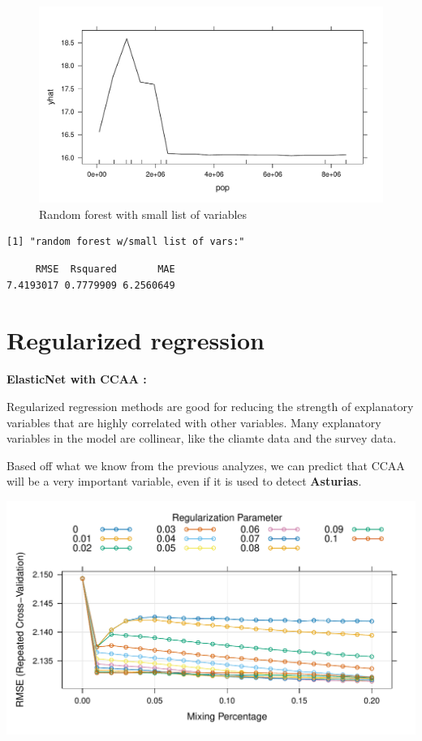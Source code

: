 \documentclass[
]{report}
\begin{document}
\begin{figure}

{\centering \includegraphics{Modelling_Energy_Intensity-V3_files/figure-pdf/unnamed-chunk-9-5.pdf}

}

\caption{Random forest with small list of variables}

\end{figure}

\begin{verbatim}
[1] "random forest w/small list of vars:"
\end{verbatim}

\begin{verbatim}
     RMSE  Rsquared       MAE 
7.4193017 0.7779909 6.2560649 
\end{verbatim}

\hypertarget{regularized-regression}{%
\section{Regularized regression}\label{regularized-regression}}

\textbf{ElasticNet with CCAA :}

Regularized regression methods are good for reducing the strength of
explanatory variables that are highly correlated with other variables.
Many explanatory variables in the model are collinear, like the cliamte
data and the survey data.

Based off what we know from the previous analyzes, we can predict that
CCAA will be a very important variable, even if it is used to detect
\textbf{Asturias}.

\includegraphics{Modelling_Energy_Intensity-V3_files/figure-pdf/glmnet_test-1.pdf}
\end{document}
